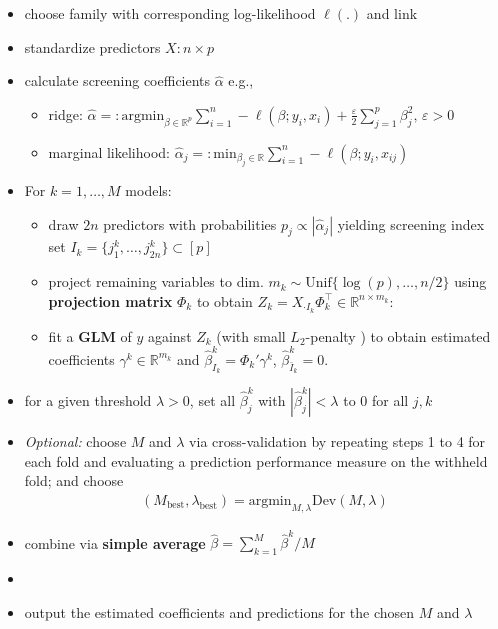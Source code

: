 \documentclass[
  article]{jss}
\providecommand{\tightlist}{%
  \setlength{\itemsep}{0pt}\setlength{\parskip}{0pt}}\usepackage{longtable,booktabs,array}
\begin{document}
\begin{itemize}
\item
  choose family with corresponding log-likelihood \(\ell(.)\) and link
\item
  standardize predictors \(X:n\times p\)
\item
  calculate screening coefficients \(\hat\alpha\) e.g.,

  \begin{itemize}
  \tightlist
  \item
    ridge:
    \(\hat\alpha=: \text{argmin}_{{\beta}\in\mathbb{R}^p}\sum_{i=1}^n -\ell(\beta;y_i,x_i) + \frac{\varepsilon}{2}\sum_{j=1}^p{\beta}_j^2, \, \varepsilon > 0\)
  \item
    marginal likelihood:
    \(\hat\alpha_j=: \text{min}_{{\beta_j}\in\mathbb{R}}\sum_{i=1}^n -\ell(\beta;y_i,x_{ij})\)
  \end{itemize}
\item
  For \(k=1,\dots,M\) models:

  \begin{itemize}
  \item
    draw \(2n\) predictors with probabilities
    \(p_j\propto |\hat\alpha_j|\) yielding screening index set
    \(I_k=\{j_1^k,\dots,j_{2n}^k\}\subset[p]\)
  \item
    project remaining variables to dim.
    \(m_k\sim \text{Unif}\{\log(p),\dots,n/2\}\) using
    \textbf{projection matrix} \(\Phi_k\) to obtain
    \(Z_k=X_{\cdot I_k}\Phi_k^\top \in \mathbb{R}^{n\times m_k}\):
  \item
    fit a \textbf{GLM} of \(y\) against \(Z_k\) (with small
    \(L_2\)-penalty \cite{glmnet2023}) to obtain estimated coefficients
    \(\gamma^k\in\mathbb{R}^{m_k}\) and
    \(\hat \beta_{I_k}^k=\Phi_k'\gamma^k\),
    \(\hat \beta_{\bar I_k}^k=0\).
  \end{itemize}
\item
  for a given threshold \(\lambda>0\), set all \(\hat\beta_j^k\) with
  \(|\hat\beta_j^k|<\lambda\) to \(0\) for all \(j,k\)
\item
  \textit{Optional:} choose \(M\) and \(\lambda\) via cross-validation
  by repeating steps 1 to 4 for each fold and evaluating a prediction
  performance measure on the withheld fold; and choose \begin{align}
       (M_{\text{best}},\lambda_{\text{best}}) = \text{argmin}_{M,\lambda}\text{Dev}(M,\lambda)
     \end{align}
\item
  combine via \textbf{simple average}
  \(\hat \beta = \sum_{k=1}^M\hat \beta^k / M\)
\item
  \item

  output the estimated coefficients and predictions for the chosen \(M\)
  and \(\lambda\)
\end{itemize}
\end{document}
